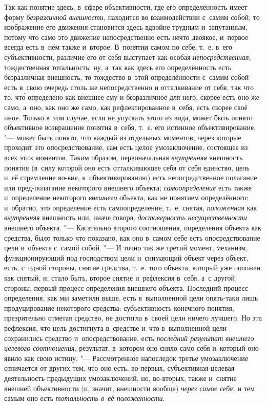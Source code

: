 Так как понятие здесь, в~сфере объективности, где его определённость
имеет форму {\em безразличной внешности,}
находится во взаимодействии с~самим собой, то изображение его
движения становится здесь вдвойне трудным и~запутанным, потому что само это
движение непосредственно есть нечто двоякое, и~первое всегда есть в~нём
также и~второе. В~понятии самом по себе, т.~е. в~его субъективности,
различие его от себя выступает как особая {\em непосредственная,}
тождественная тотальность; ну, а~так как здесь его
определённость есть безразличная внешность, то тождество в~этой
определённости с~самим собой есть в~свою очередь столь же непосредственно и
отталкивание от себя, так что то, чт\'{о} определено как внешнее ему и
безразличное для него, скорее есть оно же само, а~оно, как оно же само, как
рефлектированное в~себя, есть скорее своё иное. Только в~том случае, если
не упускать этого из вида, может быть понято объективное возвращение
понятия в~себя, т.~е. его истинное объективирование, "--- может
быть понято, что каждый из отдельных моментов, через которые проходит это
опосредствование, сам есть целое умозаключение, состоящее из всех этих
моментов. Таким образом, первоначальная
{\em внутренняя}
внешность понятия (в~силу которой оно есть отталкивающее себя
от себя единство, цель и~её стремление во-вне, к~объективированию) есть
непосредственное полагание или пред-полагание некоторого внешнего объекта;
{\em самоопределение}
есть также и~определение некоторого
{\em внешнего} объекта,
как не понятием определённого; и~обратно, это определение есть
самоопределение, т.~е. снятая,
{\em положенная} как
{\em внутренняя}
внешность или, иначе говоря,
{\em достоверность несущественности}
внешнего объекта. "--- Касательно второго
соотношения, определения объекта как средства, было только что показано,
как оно в~самом себе есть опосредствование цели в~объекте с~самой собой. "---
И точно так же третий момент, механизм, функционирующий под
господством цели и~снимающий объект через объект, есть, с~одной стороны,
снятие средства, т.~е. того объекта, который уже положен как снятый, и,
стало быть, второе снятие и~рефлексия в~себя, а~с другой стороны, первый
процесс определения внешнего объекта. Последний процесс определения, как мы
заметили выше, есть в~выполненной цели опять-таки лишь
продуцирование некоторого средства: субъективность конечного понятия,
презрительно отметая средство, не достигла в~своей цели ничего лучшего. Но
эта рефлексия, что цель достигнута в~средстве и~что в~выполненной цели
сохранились средство и~опосредствование, есть
{\em последний результат внешнего
целевого соотношения,} результат, в~котором оно сняло само
себя и~который оно явило как свою истину. "--- Рассмотренное
напоследок третье умозаключение отличается от других тем, что оно есть,
во-первых, субъективная целевая деятельность предыдущих умозаключений, но,
во-вторых, также и~снятие внешней объективности (и, значит, внешности
вообще) {\em через самое себя,}
и тем самым оно есть
{\em тотальность в~её положенности}.

